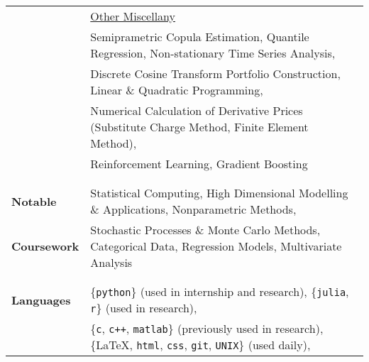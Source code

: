 \documentclass[utf8,letterpaper,oneside]{article}
\begin{document}
\begin{center}
\begin{tabular}{l l}
                           & \underline{Other Miscellany}                                                                                                                     \\
                           & Semiprametric Copula Estimation, Quantile Regression, Non-stationary Time Series Analysis,                                                       \\
                           & Discrete Cosine Transform Portfolio Construction, Linear \& Quadratic Programming,                                                               \\
                           & Numerical Calculation of Derivative Prices (Substitute Charge Method, Finite Element Method),                                                     \\
                           & {Reinforcement Learning}, {Gradient Boosting}                                                                                                    \\
                           &                                                                                                                                                  \\ \hline
                           &                                                                                                                                                  \\
  \textbf{Notable}         & Statistical Computing, {High Dimensional} Modelling \& Applications, {Nonparametric} Methods,                                                    \\
  \textbf{Coursework}      & Stochastic Processes \& Monte Carlo Methods, Categorical Data, Regression Models, Multivariate Analysis                                          \\
                           &                                                                                                                                                  \\ \hline
                           &                                                                                                                                                  \\
  \textbf{Languages}       & \{{\texttt{python}}\} (used in internship and research), \{{\texttt{julia}, \texttt{r}}\} (used in research),                                    \\ &\{{\texttt{c}, \texttt{c++}}, \texttt{matlab}\} (previously used in research), \{\LaTeX, \texttt{html}, \texttt{css}, {\texttt{git}}, \texttt{UNIX}\} (used daily),                  \\

\end{tabular}
\end{center}
\end{document}
